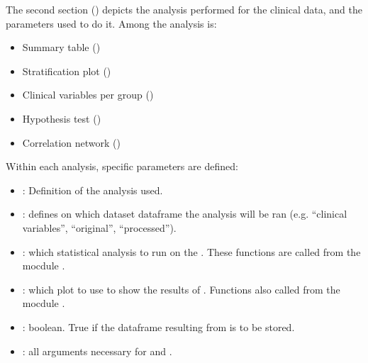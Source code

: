 \documentclass[letterpaper,10pt,english]{sphinxmanual}
\begin{document}
The second section () depicts the analysis performed for the clinical data, and the parameters used to do it.
Among the analysis is:
\begin{itemize}
\item {} 
Summary table ()

\item {} 
Stratification plot ()

\item {} 
Clinical variables per group ()

\item {} 
Hypothesis test ()

\item {} 
Correlation network ()

\end{itemize}

Within each analysis, specific parameters are defined:
\begin{itemize}
\item {} 
: Definition of the analysis used.

\item {} 
: defines on which dataset dataframe the analysis will be ran (e.g. “clinical variables”, “original”, “processed”).

\item {} 
: which statistical analysis to run on the . These functions are called from the mocdule .

\item {} 
: which plot to use to show the results of . Functions also called from the mocdule .

\item {} 
: boolean. True if the dataframe resulting from  is to be stored.

\item {} 
: all arguments necessary for  and .

\end{itemize}
\end{document}
